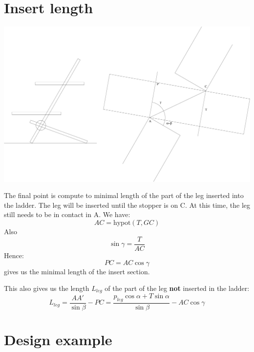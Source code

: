 \documentclass{article}
\begin{document}
\section{Insert length}
\begin{center}
    \includegraphics[width=0.99\columnwidth]{slot3.pdf}
\end{center}
The final point is compute to minimal length of the part of the leg inserted into the ladder. The leg will be inserted until the stopper is on C. At this time, the leg still needs to be in contact in A.
We have:
$$
AC = \textrm{hypot}(T,GC)
$$
Also
$$
\sin \gamma = \frac{T}{AC}
$$
Hence:
\begin{equation}
\label{eq:insert}
PC = AC \cos \gamma
\end{equation}
gives us the minimal length of the insert section. 

This also gives us the length $L_{leg}$ of the part of the leg {\bf not} inserted in the ladder:
\begin{equation}
    \label{eq:leglength}
    L_{leg} = \frac{AA'}{\sin\beta} - PC = \frac{p_{leg}\cos\alpha + T \sin \alpha}{\sin \beta} - AC\cos\gamma
\end{equation}

\section{Design example}
\end{document}
